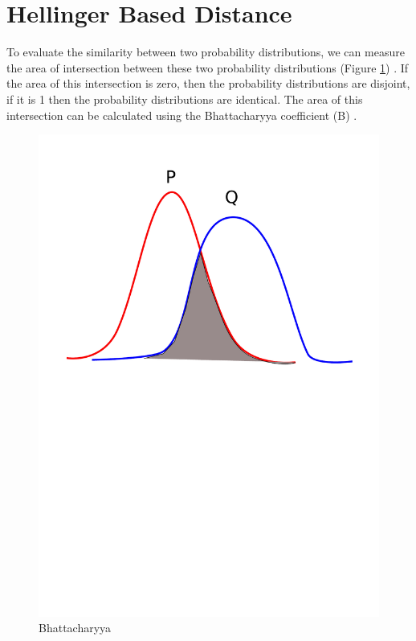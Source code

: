 \section{Hellinger Based Distance}
To evaluate the similarity between two probability distributions, we can measure the area of intersection between these two probability distributions (Figure \ref{Bhattacharyya}) . If the area of this intersection is zero, then the probability distributions are disjoint, if it is 1 then the probability distributions are identical. The area of this intersection can be calculated using the Bhattacharyya coefficient (B) \cite{patra2015new}.

\begin{figure}
\centering
\includegraphics[bb=50bp 400bp 595bp 842bp,clip,
scale=0.3]{images/Bhattacharyya_comparaison}

\caption{Bhattacharyya}
\label{Bhattacharyya}

\end{figure}

